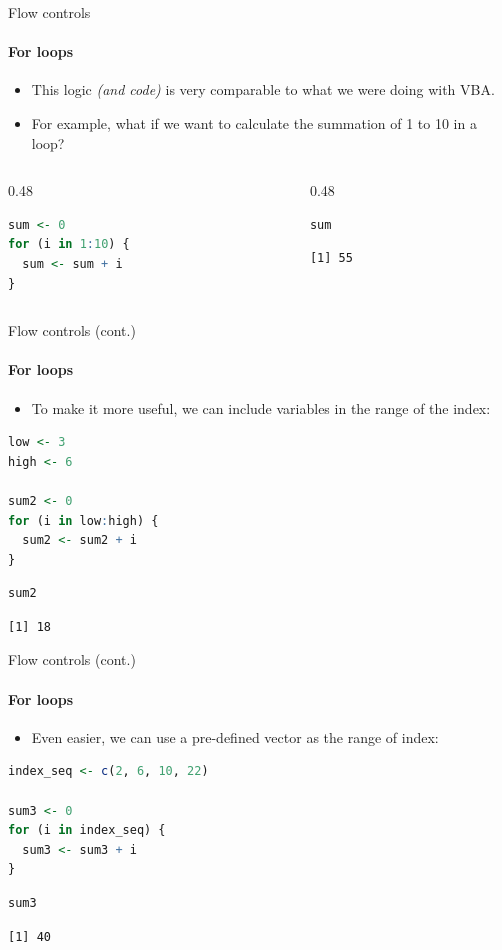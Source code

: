 \begin{frame}[fragile]{Flow controls}
\framesubtitle{For loops}
\begin{itemize}
  \item This logic \textit{(and code)} is very comparable to what we were doing with VBA.
  \item For example, what if we want to calculate the summation of 1 to 10 in a loop?
\end{itemize}
\begin{columns}[T]
\begin{column}{0.48\textwidth}
\begin{lstlisting}[language=R]
sum <- 0
for (i in 1:10) {
  sum <- sum + i
}
\end{lstlisting}
\end{column}
\begin{column}{0.48\textwidth}
\begin{lstlisting}[language=R]
sum
\end{lstlisting}
\begin{lstlisting}[style=output]
[1] 55
\end{lstlisting}
\end{column}
\end{columns}
\end{frame}

\begin{frame}[fragile]{Flow controls (cont.)}
\framesubtitle{For loops}
\begin{itemize}
  \item To make it more useful, we can include variables in the range of the index:
\end{itemize}
\begin{lstlisting}[language=R]
low <- 3
high <- 6

sum2 <- 0
for (i in low:high) {
  sum2 <- sum2 + i
}
\end{lstlisting}
\begin{lstlisting}[language=R]
sum2
\end{lstlisting}
\begin{lstlisting}[style=output]
[1] 18
\end{lstlisting}
\end{frame}

\begin{frame}[fragile]{Flow controls (cont.)}
\framesubtitle{For loops}
\begin{itemize}
  \item Even easier, we can use a pre-defined vector as the range of index:
\end{itemize}
\begin{lstlisting}[language=R]
index_seq <- c(2, 6, 10, 22)

sum3 <- 0
for (i in index_seq) {
  sum3 <- sum3 + i
}
\end{lstlisting}
\begin{lstlisting}[language=R]
sum3
\end{lstlisting}
\begin{lstlisting}[style=output]
[1] 40
\end{lstlisting}
\end{frame}

